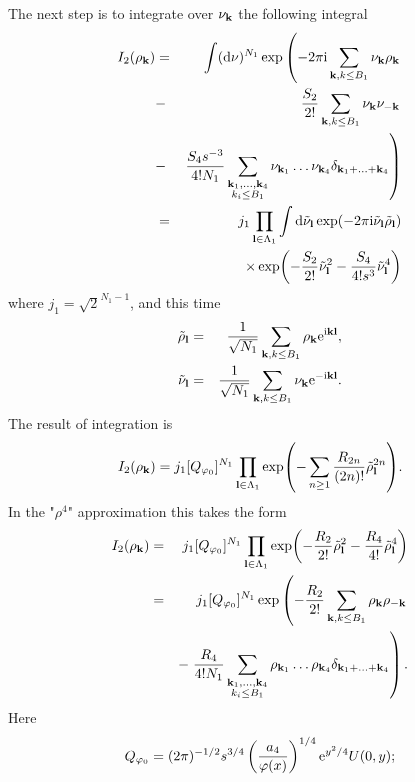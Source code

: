 The next step is to integrate over $\nu_{\vb k}$ the following integral
\begin{eqnarray*}
	I_2(\rho_{\vb k}) & = & \int ({\rm d} \nu)^{N_1} 
	\exp 
	\left(-2\pi{\rm i} \sum_{\vb k, k \leq B_1} \nu_{\vb k}\rho_{\vb k}
	\right.
	\\
	&-&
	\left.
	 \frac{S_2}{2!} \sum_{\vb k, k \leq B_1} \nu_{\vb k}\nu_{-\vb k}
	\right.
	\\
	& - &
	\left. 
		\frac{S_4 s^{-3}}{4! N_1} \sum_{\substack{\vb k_1, \dotsc, \vb k_4 \\ k_i \leq B_1}} \nu_{\vb k_1} \dotsc \nu_{\vb k_4} \delta_{\vb{k}_1 + \dotsc + \vb{k}_4}
	\right)
	\\
	& = &
	j_1 \prod_{\vb l \in \Lambda_1} \int {\rm d} \tilde{\nu}_{\vb l} 
	\exp(-2\pi {\rm i} \tilde{\nu}_{\vb l} \tilde{\rho}_{\vb l})
	\\
	&& \times \exp(- \frac{S_2}{2!}\tilde{\nu}_{\vb l}^2
	- \frac{S_4}{4! s^3} \tilde{\nu}_{\vb l}^4  )
\end{eqnarray*}
where $j_1 = \sqrt{2}^{N_1 - 1}$, and this time
\begin{eqnarray*}
	\tilde{\rho}_{\vb l} & = &  \frac{1}{\sqrt{N_1}}\sum_{\vb k, k \leq B_1}\rho_{\vb k}{\rm e}^{{\rm i}{\vb k}{\vb l}}
	,
	\\
	\tilde{\nu}_{\vb l} & = & \frac{1}{\sqrt{N_1}}\sum_{\vb k, k \leq B_1}\nu_{\vb k}{\rm e}^{-{\rm i}{\vb k}{\vb l}}.
\end{eqnarray*}
The result of integration is
\begin{equation*}
	I_2(\rho_{\vb k}) = j_1 [Q_{\varphi_0}]^{N_1} \prod_{\vb l \in \Lambda_1} 
	\exp(- \sum_{n \geq 1} \frac{R_{2n}}{(2n)!} \tilde{\rho}_{\vb l}^{2n} ).
\end{equation*}
In the "$\rho^4$" approximation this takes the form
\begin{eqnarray*}
	I_2(\rho_{\vb k}) & = & j_1 [Q_{\varphi_0}]^{N_1} \prod_{\vb l \in \Lambda_1}
	\exp( - \frac{R_2}{2!} \tilde{\rho}_{\vb l}^2 - \frac{R_4}{4!} \tilde{\rho}_{\vb l}^4)
	\\
	& = & j_1 [Q_{\varphi_0}]^{N_1} 
	\exp\left( -\frac{R_2}{2!} \sum_{\vb k, k \leq B_1} \rho_{\vb k} \rho_{-\vb k} 
	\right.
	\\
	&& - \left. \frac{R_4}{4!N_1} 
	\sum_{\substack{\vb k_1, \dotsc, \vb k_4 \\ k_i \leq B_1}} \rho_{\vb k_1} \dotsc \rho_{\vb k_4} \delta_{\vb{k}_1 + \dotsc + \vb{k}_4}\right).
\end{eqnarray*}
Here
\begin{equation*}
	Q_{\varphi_0} = (2\pi)^{-1/2} s^{3/4} \left(\frac{a_4}{\varphi(x)}\right)^{1/4} {\rm e}^{y^2/4} U(0,y);
\end{equation*}
